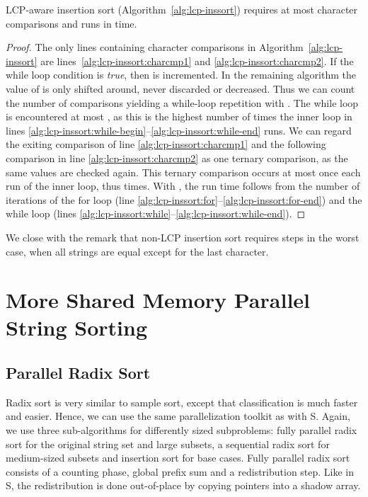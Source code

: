 \documentclass[a4paper]{myjournal}
\begin{document}
\begin{theorem}
  LCP-aware insertion sort (Algorithm~\ref{alg:lcp-inssort}) requires at most  character comparisons and runs in  time.
\end{theorem}
\begin{proof}
  The only lines containing character comparisons in
  Algorithm~\ref{alg:lcp-inssort} are lines~\ref{alg:lcp-inssort:charcmp1} and
  \ref{alg:lcp-inssort:charcmp2}.  If the while loop condition is \textsl{true},
  then  is incremented.  In the remaining algorithm the value of  is
  only shifted around, never discarded or decreased.  Thus we can count the
  number of comparisons yielding a while-loop repetition with .  The while
  loop is encountered at most , as this is the highest number
  of times the inner loop in lines
  \ref{alg:lcp-inssort:while-begin}--\ref{alg:lcp-inssort:while-end} runs.  We
  can regard the exiting comparison of line \ref{alg:lcp-inssort:charcmp1} and
  the following comparison in line \ref{alg:lcp-inssort:charcmp2} as one ternary
  comparison, as the same values are checked again.  This ternary comparison
  occurs at most once each run of the inner loop, thus 
  times.  With , the run time follows from the number of iterations of
  the for loop (line \ref{alg:lcp-inssort:for}--\ref{alg:lcp-inssort:for-end})
  and the while loop (lines
  \ref{alg:lcp-inssort:while}--\ref{alg:lcp-inssort:while-end}).
\end{proof}

We close with the remark that non-LCP insertion sort requires 
steps in the worst case, when all strings are equal except for the last
character.

\section{More Shared Memory Parallel String Sorting}\label{sec:more-parasort}

\subsection{Parallel Radix Sort}\label{sec:para-radixsort}

Radix sort is very similar to sample sort, except that classification is much
faster and easier. Hence, we can use the same parallelization toolkit as with
S. Again, we use three sub-algorithms for differently sized subproblems:
fully parallel radix sort for the original string set and large subsets, a
sequential radix sort for medium-sized subsets and insertion sort for base
cases. Fully parallel radix sort consists of a counting phase, global prefix sum
and a redistribution step. Like in S, the redistribution is done
out-of-place by copying pointers into a shadow array.
\end{document}
